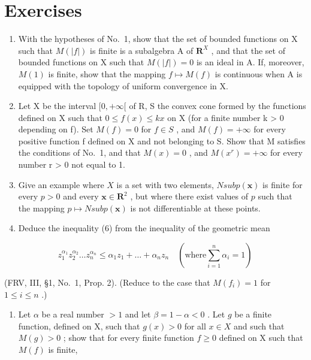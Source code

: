 \chapter*{Exercises}
{}

\begin{enumerate}
\def\labelenumi{\arabic{enumi})}
\item
  With the hypotheses of No.~1, show that the set of bounded functions on X such that \(M(|f|)\) is finite is a subalgebra A of \(\mathbf{R}^X\) , and that the set of bounded functions on X such that \(M(|f|) = 0\) is an ideal in A. If, moreover, \(M(1)\) is finite, show that the mapping \(f \mapsto M(f)\) is continuous when A is equipped with the topology of uniform convergence in X.
\item
  Let X be the interval \([0, +\infty[\) of R, S the convex cone formed by the functions defined on X such that \(0 \leqslant f(x) \leqslant kx\) on X (for a finite number k \textgreater{} 0 depending on f). Set \(M(f) = 0\) for \(f \in S\) , and \(M(f) = +\infty\) for every positive function f defined on X and not belonging to S. Show that M satisfies the conditions of No.~1, and that \(M(x) = 0\) , and \(M(x^{r}) = +\infty\) for every number r \textgreater{} 0 not equal to 1.
\item
  Give an example where \(X\) is a set with two elements, \(N sub p(\mathbf{x})\) is finite for every \(p > 0\) and every \(\mathbf{x} \in \mathbf{R}^2\) , but where there exist values of \(p\) such that the mapping \(p \mapsto N sub p(\mathbf{x})\) is not differentiable at these points.
\item
  Deduce the inequality (6) from the inequality of the geometric mean
\end{enumerate}

\[
z _ {1} ^ {\alpha_ {1}} z _ {2} ^ {\alpha_ {2}} \dots z _ {n} ^ {\alpha_ {n}} \leqslant \alpha_ {1} z _ {1} + \dots + \alpha_ {n} z _ {n} \quad (\text {where} \sum_ {i = 1} ^ {n} \alpha_ {i} = 1)
\]

(FRV, III, §1, No.~1, Prop. 2). (Reduce to the case that \(M(f_i) = 1\) for \(1 \leqslant i \leqslant n\) .)

\begin{enumerate}
\def\labelenumi{\arabic{enumi})}
\setcounter{enumi}{4}
\tightlist
\item
  Let \(\alpha\) be a real number \(>1\) and let \(\beta = 1 - \alpha < 0\) . Let \(g\) be a finite function, defined on X, such that \(g(x) > 0\) for all \(x \in X\) and such that \(M(g) > 0\) ; show that for every finite function \(f \geqslant 0\) defined on X such that \(M(f)\) is finite,
\end{enumerate}

